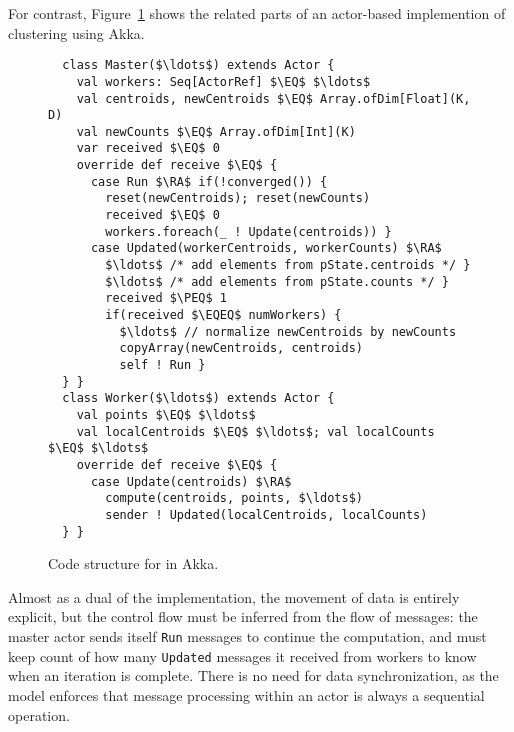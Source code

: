 For contrast, Figure~\ref{fig:kmeansakka} shows the related parts of an
actor-based implemention of \kmeans clustering using Akka.
\begin{figure}
\begin{lstlisting}
  class Master($\ldots$) extends Actor {
    val workers: Seq[ActorRef] $\EQ$ $\ldots$
    val centroids, newCentroids $\EQ$ Array.ofDim[Float](K, D)
    val newCounts $\EQ$ Array.ofDim[Int](K)
    var received $\EQ$ 0
    override def receive $\EQ$ {
      case Run $\RA$ if(!converged()) {
        reset(newCentroids); reset(newCounts)
        received $\EQ$ 0
        workers.foreach(_ ! Update(centroids)) }
      case Updated(workerCentroids, workerCounts) $\RA$
        $\ldots$ /* add elements from pState.centroids */ }
        $\ldots$ /* add elements from pState.counts */ }
        received $\PEQ$ 1
        if(received $\EQEQ$ numWorkers) {
          $\ldots$ // normalize newCentroids by newCounts
          copyArray(newCentroids, centroids)
          self ! Run }
  } }
  class Worker($\ldots$) extends Actor {
    val points $\EQ$ $\ldots$
    val localCentroids $\EQ$ $\ldots$; val localCounts $\EQ$ $\ldots$
    override def receive $\EQ$ {
      case Update(centroids) $\RA$
        compute(centroids, points, $\ldots$)
        sender ! Updated(localCentroids, localCounts)
  } }
\end{lstlisting}
\caption{Code structure for \kmeans in Akka.\label{fig:kmeansakka}}
\end{figure}
Almost as a dual of the \apgas implementation, the movement of data is entirely
explicit, but the control flow must be inferred from the flow of messages: the
master actor sends itself \lstinline{Run} messages to continue the computation,
and must keep count of how many \lstinline{Updated} messages it received from
workers to know when an iteration is complete. There is no need for data
synchronization, as the model enforces that message processing within an actor
is always a sequential operation.

% 
% 
% 
